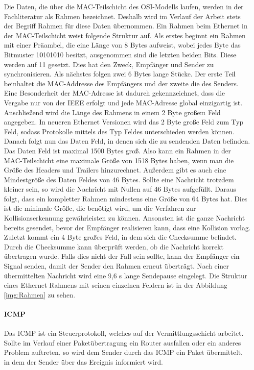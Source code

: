 Die Daten, die über die \gls{MAC}-Teilschicht des \gls{OSI-Modell}s laufen, werden in der Fachliteratur als Rahmen bezeichnet. Deshalb wird im Verlauf der Arbeit stets der Begriff Rahmen für diese Daten übernommen. Ein Rahmen beim Ethernet in der \gls{MAC}-Teilschicht weist folgende Struktur auf. Als erstes beginnt ein Rahmen mit einer Präambel, die eine Länge von 8 Bytes aufweist, wobei jedes Byte das Bitmuster 10101010 besitzt, ausgenommen sind die letzten beiden Bits. Diese werden auf 11 gesetzt. Dies hat den Zweck, Empfänger und Sender zu synchronisieren. Als nächstes folgen zwei 6 Bytes lange Stücke. Der erste Teil beinhaltet die \gls{MAC}-Addresse des Empfängers und der zweite die des Senders. Eine Besonderheit der \gls{MAC}-Adresse ist dadurch gekennzeichnet, dass die Vergabe nur von der \gls{IEEE} erfolgt und jede \gls{MAC}-Adresse global einzigartig ist. Anschließend wird die Länge des Rahmens in einem 2 Byte großem Feld angegeben. In neueren Ethernet Versionen wird das 2 Byte große Feld zum Typ Feld, sodass Protokolle mittels des Typ Feldes unterschieden werden können. Danach folgt nun das Daten Feld, in denen sich die zu sendenden Daten befinden. Das Daten Feld ist maximal 1500 Bytes groß. Also kann ein Rahmen in der \gls{MAC}-Teilschicht eine maximale Größe von 1518 Bytes haben, wenn man die Größe des Headers und Trailers hinzurechnet. Außerdem gibt es auch eine Mindestgröße des Daten Feldes von 46 Bytes. Sollte eine Nachricht trotzdem kleiner sein, so wird die Nachricht mit Nullen auf 46 Bytes aufgefüllt. Daraus folgt, dass ein kompletter Rahmen mindestens eine Größe von 64 Bytes hat. Dies ist die minimale Größe, die benötigt wird, um die Verfahren zur Kollisionserkennung gewährleisten zu können. Ansonsten ist die ganze Nachricht bereits gesendet, bevor der Empfänger realisieren kann, dass eine Kollision vorlag. Zuletzt kommt ein 4 Byte großes Feld, in dem sich die Checksumme befindet. Durch die Checksumme kann überprüft werden, ob die Nachricht korrekt übertragen wurde. Falls dies nicht der Fall sein sollte, kann der Empfänger ein Signal senden, damit der Sender den Rahmen erneut überträgt. Nach einer übermittelten Nachricht wird eine 9,6 \textmu s lange Sendepause eingelegt.
Die Struktur eines Ethernet Rahmens mit seinen einzelnen Feldern ist in der Abbildung \ref{img:Rahmen} zu sehen. \\
\\
\textbf{ICMP}\\
\\
Das \gls{ICMP} ist ein Steuerprotokoll, welches auf der Vermittlungsschicht arbeitet. Sollte im Verlauf einer Paketübertragung ein Router ausfallen oder ein anderes Problem auftreten, so wird dem Sender durch das \gls{ICMP} ein Paket übermittelt, in dem der Sender über das Ereignis informiert wird. 
